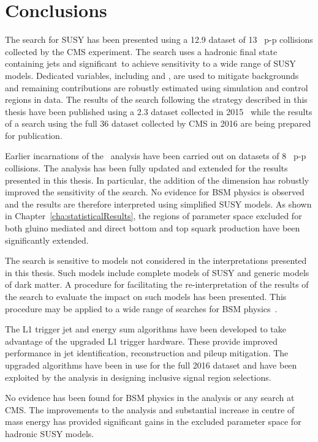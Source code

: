 \chapter{Conclusions}

The \alphat search for SUSY has been presented using a 12.9 \ifb 
dataset of 13 \TeV~p-p collisions collected by the CMS experiment. 
The search uses a hadronic final state containing jets and 
significant~\met to achieve sensitivity to a wide range of SUSY
models. Dedicated variables, including \alphat and \bdphi, are used 
to mitigate backgrounds and remaining contributions
are robustly estimated using simulation and control regions in data.
The results of the \alphat search following the strategy
described in this thesis have been published using 
a 2.3 \ifb dataset collected in 2015~\cite{alphat2015} while the results 
of a search using the full 36 \ifb dataset collected by CMS in 2016 
are being prepared for publication.

Earlier incarnations of the \alphat~analysis have been carried out
on datasets of 8 \TeV~p-p collisions. The analysis has been
fully updated and extended for the results presented in this thesis. 
In particular, the addition of the \mht dimension has robustly improved the sensitivity of the search. 
No evidence for BSM physics is observed and the results are 
therefore interpreted using simplified SUSY models. As shown in Chapter~\ref{cha:statisticalResults},
the regions of parameter space excluded for both gluino mediated 
and direct bottom and top squark production have been 
significantly extended.

The \alphat search is sensitive to models not considered in the
interpretations presented in this thesis. Such models include 
complete models of SUSY and generic models of dark matter. 
A procedure for facilitating the re-interpretation of the results of the search to evaluate the 
impact on such models has been presented. This procedure 
may be applied to a wide range of searches for BSM physics~\cite{simp-lik}.

The L1 trigger jet and energy sum algorithms have been
developed to take advantage of the upgraded L1 trigger hardware.
These provide improved performance in jet identification, 
reconstruction and pileup mitigation. The upgraded algorithms have
been in use for the full 2016 dataset and have been exploited
by the \alphat analysis in designing inclusive signal region selections.

No evidence has been found for BSM physics in the \alphat analysis 
or any search at CMS. The improvements to the analysis and substantial
increase in centre of mass energy has provided significant gains in
the excluded parameter space for hadronic SUSY models. 

